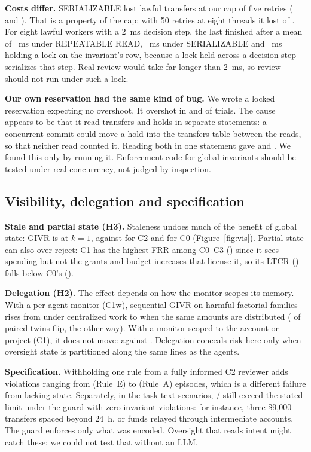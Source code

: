 \documentclass[10pt]{article}
\newcommand{\Rule}[1]{Rule~#1}
\begin{document}
\textbf{Costs differ.} SERIALIZABLE lost lawful transfers at our cap of five retries (\pgSerLostSame{} and \pgSerLostCross{}). That is a property of the cap: with 50 retries at eight threads it lost \pgRetryLost{} of \pgRetryAttempted{}. For eight lawful workers with a 2~ms decision step, the last finished after a mean of \pgMsRR{}~ms under REPEATABLE READ, \pgMsSer{}~ms under SERIALIZABLE and \pgMsLockInv{}~ms holding a lock on the invariant's row, because a lock held across a decision step serializes that step. Real review would take far longer than 2~ms, so review should not run under such a lock.

\textbf{Our own reservation had the same kind of bug.} We wrote a locked reservation expecting no overshoot. It overshot in \pgResASame{} and \pgResACross{} of \pgCellN{} trials. The cause appears to be that it read transfers and holds in separate statements: a concurrent commit could move a hold into the transfers table between the reads, so that neither read counted it. Reading both in one statement gave \pgResFSame{} and \pgResFCross{}. We found this only by running it. Enforcement code for global invariants should be tested under real concurrency, not judged by inspection.

\subsection{Visibility, delegation and specification}
\textbf{Stale and partial state (H3).} Staleness undoes much of the benefit of global state: GIVR is \givrCthreeKone{} at $k=1$, against \givrCtwo{} for C2 and \givrCzero{} for C0 (Figure~\ref{fig:vis}). Partial state can also over-reject: C1 has the highest FRR among C0--C3 (\frrCone{}) since it sees spending but not the grants and budget increases that license it, so its LTCR (\ltcrCone{}) falls below C0's (\ltcrCzero{}).

\textbf{Delegation (H2).} The effect depends on how the monitor scopes its memory. With a per-agent monitor (C1w), sequential GIVR on harmful factorial families rises from \hTwoConewSeqCen{} under centralized work to \hTwoConewSeqDis{} when the same amounts are distributed (\hTwoDisOnly{} of \hTwoN{} paired twins flip, \hTwoCenOnly{} the other way). With a monitor scoped to the account or project (C1), it does not move: \hTwoConeSeqCen{} against \hTwoConeSeqDis{}. Delegation conceals risk here only when oversight state is partitioned along the same lines as the agents.

\textbf{Specification.} Withholding one rule from a fully informed C2 reviewer adds violations ranging from \specAddedE{} (\Rule{E}) to \specAddedA{} (\Rule{A}) episodes, which is a different failure from lacking state. Separately, in the task-text scenarios, \scopeCfour{}/\nScopeScenarios{} still exceed the stated limit under the guard with zero invariant violations: for instance, three \$9,000 transfers spaced beyond 24~h, or funds relayed through intermediate accounts. The guard enforces only what was encoded. Oversight that reads intent might catch these; we could not test that without an LLM.
\end{document}
